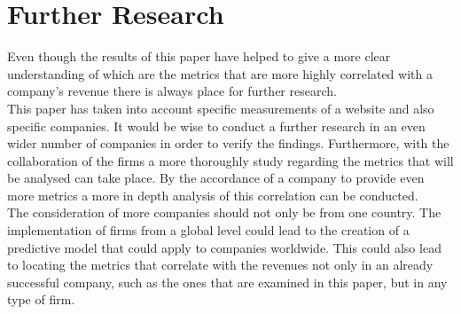\documentclass{article}
\begin{document}
\section{Further Research}
Even though the results of this paper have helped to give a more clear understanding of which are the metrics that are more highly correlated with a company's revenue there is always place for further research.\\
This paper has taken into account specific measurements of a website and also specific companies. It would be wise to conduct a further research in an even wider number of companies in order to verify the findings. Furthermore, with the collaboration of the firms a more thoroughly study regarding the metrics that will be analysed can take place. By the accordance of a company to provide even more metrics a more in depth analysis of this correlation can be conducted.\\
The consideration of more companies should not only be from one country. The implementation of firms from a global level could lead to the creation of a predictive model that could apply to companies worldwide. This could also lead to locating the metrics that correlate with the revenues not only in an already successful company, such as the ones that are examined in this paper, but in any type of firm.\\


\pagebreak  
\end{document}

